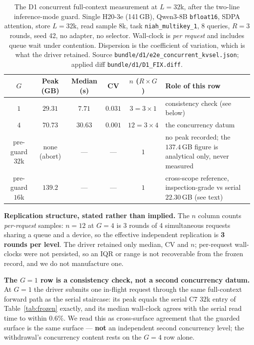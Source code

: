 \documentclass{article}
\newcommand{\zb}{\discretionary{}{}{}}
\newcommand{\code}[1]{\texttt{#1}}
\begin{document}
\begin{table}[t]
\centering
\caption{The D1 concurrent full-context measurement at $L{=}32$k, after the two-line
inference-mode guard. Single H20-3e (141\,GB), Qwen3-8B \texttt{bfloat16}, SDPA attention,
store $L{=}32$k, read sample $8$k, task \code{niah\_multikey\_1}, 8 queries, $R{=}3$ rounds,
seed 42, no adapter, no selector. Wall-clock is \emph{per request} and includes queue wait
under contention. Dispersion is the coefficient of variation, which is what the driver
retained. Source \code{bundle/d1/\zb e2e\_concurrent\_kvsel.json}; applied diff
\code{bundle/d1/D1\_FIX.diff}.}
\label{tab:d1}
\small
\begin{tabular}{@{}ccccc>{\raggedright\arraybackslash}p{4.6cm}@{}}
\toprule
\textbf{$G$} & \textbf{Peak (GB)} & \textbf{Median (s)} & \textbf{CV} &
\textbf{$n$ ($R{\times}G$)} & \textbf{Role of this row} \\
\midrule
$1$ & $29.31$ & $7.71$ & $0.031$ & $3=3{\times}1$ & consistency check (see below) \\
$4$ & $70.73$ & $30.63$ & $0.001$ & $12=3{\times}4$ & the concurrency datum \\
\midrule
pre\--guard $32$k & none (abort) & --- & --- & $1$ & no peak recorded; the $137.4$\,GB figure is analytical only, never measured \\
pre\--guard $16$k & $139.2$ & --- & --- & $1$ & cross-scope reference, inspection-grade vs serial $22.30$\,GB (see text) \\
\bottomrule
\end{tabular}
\end{table}

\textbf{Replication structure, stated rather than implied.} The $n$ column counts
\emph{per-request} samples: $n{=}12$ at $G{=}4$ is 3 rounds of 4 simultaneous requests sharing a
queue and a device, so the effective independent replication is \textbf{3 rounds per level}. The
driver retained only median, CV and $n$; per-request wall-clocks were not persisted, so an IQR or
range is not recoverable from the frozen record, and we do not manufacture one.

\textbf{The $G{=}1$ row is a consistency check, not a second concurrency datum.} At $G{=}1$ the
driver submits one in-flight request through the same full-context forward path as the serial
staircase: its peak equals the serial C7 $32$k entry of Table~\ref{tab:frozen} exactly, and its
median wall-clock agrees with the serial read time to within $0.6\%$. We read this as
cross-surface agreement that the guarded surface is the same surface --- \textbf{not} an
independent second concurrency level; the withdrawal's concurrency content rests on the $G{=}4$
row alone.
\end{document}
